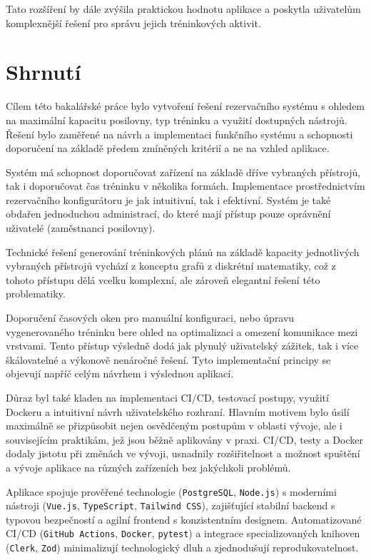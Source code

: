 Tato rozšíření by dále zvýšila praktickou hodnotu aplikace a poskytla uživatelům komplexnější řešení pro správu jejich tréninkových aktivit.

\section{Shrnutí}
Cílem této bakalářské práce bylo vytvoření řešení rezervačního systému s ohledem na maximální kapacitu posilovny, typ tréninku a využití dostupných nástrojů. Řešení bylo zaměřené na návrh a implementaci funkčního systému a schopnosti doporučení na základě předem zmíněných kritérií a ne na vzhled aplikace. 

Systém má schopnost doporučovat zařízení na základě dříve vybraných přístrojů, tak i doporučovat čas tréninku v několika formách. Implementace prostřednictvím rezervačního konfigurátoru je jak intuitivní, tak i efektivní. Systém je také obdařen jednoduchou administrací, do které mají přístup pouze oprávnění uživatelé (zaměstnanci posilovny). 

Technické řešení generování tréninkových plánů na základě kapacity jednotlivých vybraných přístrojů vychází z konceptu grafů z diskrétní matematiky, což z tohoto přístupu dělá vcelku komplexní, ale zároveň elegantní řešení této problematiky.

Doporučení časových oken pro manuální konfiguraci, nebo úpravu vygenerovaného tréninku bere ohled na optimalizaci a omezení komunikace mezi vrstvami. Tento přístup výsledně dodá jak plynulý uživatelský zážitek, tak i více škálovatelné a výkonově nenáročné řešení. Tyto implementační principy se objevují napříč celým návrhem i výslednou aplikací.

Důraz byl také kladen na implementaci CI/CD, testovací postupy, využití Dockeru a intuitivní návrh uživatelského rozhraní. Hlavním motivem bylo úsilí maximálně se přizpůsobit nejen osvědčeným postupům v oblasti vývoje, ale i souvisejícím praktikám, jež jsou běžně aplikovány v praxi. CI/CD, testy a Docker dodaly jistotu při změnách ve vývoji, usnadnily rozšiřitelnost a možnost spuštění a vývoje aplikace na různých zařízeních bez jakýchkoli problémů. 

Aplikace spojuje prověřené technologie (\texttt{PostgreSQL}, \texttt{Node.js}) s moderními nástroji (\texttt{Vue.js}, \texttt{TypeScript}, \texttt{Tailwind CSS}), zajišťující stabilní backend s typovou bezpečností a agilní frontend s konzistentním designem. Automatizované CI/CD (\texttt{GitHub Actions}, \texttt{Docker}, \texttt{pytest}) a integrace specializovaných knihoven (\texttt{Clerk}, \texttt{Zod}) minimalizují technologický dluh a zjednodušují reprodukovatelnost.

